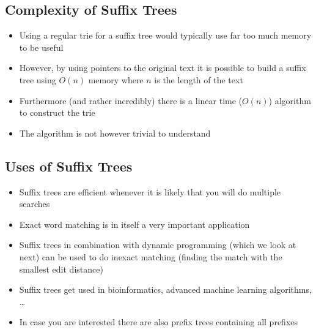 \begin{slide}
\section{Complexity of Suffix Trees}

\begin{PauseHighLight}
  \begin{itemize}
  \item Using a regular trie for a suffix tree would typically use far
    too much memory to be useful\pause
  \item However, by using pointers to the original text it is possible
    to build a suffix tree using $O(n)$ memory where $n$ is the length
    of the text\pause
  \item Furthermore (and rather incredibly) there is a linear time
    ($O(n)$) algorithm to construct the trie\pause
  \item The algorithm is not however trivial to understand\pause
  \end{itemize}
\end{PauseHighLight}

\end{slide}


\begin{slide}
\section{Uses of Suffix Trees}

\begin{PauseHighLight}
  \begin{itemize}
  \item Suffix trees are efficient whenever it is likely that you will
    do multiple searches\pause
  \item Exact word matching is in itself a very important application\pause
  \item Suffix trees in combination with dynamic programming (which we
    look at next) can be used to do inexact matching (finding the match
    with the smallest edit distance)\pause
  \item Suffix trees get used in bioinformatics, advanced machine
    learning algorithms, \ldots\pause
  \item In case you are interested there are also prefix trees
    containing all prefixes\pause
  \end{itemize}
\end{PauseHighLight}

\end{slide}





